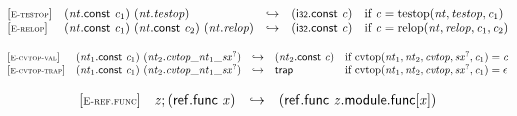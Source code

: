 \vspace{1ex}

$$
\begin{array}{@{}l@{}lcl@{}l@{}}
{[\textsc{\scriptsize E{-}testop}]} \quad & ({\mathit{nt}}.\mathsf{const}~{\mathit{c}}_{{1}})~({\mathit{nt}} . {\mathit{testop}}) &\hookrightarrow& (\mathsf{i{\scriptstyle32}}.\mathsf{const}~{\mathit{c}}) &\quad
  \mbox{if}~{\mathit{c}} = {\mathrm{testop}}({\mathit{nt}}, {\mathit{testop}}, {\mathit{c}}_{{1}}) \\
{[\textsc{\scriptsize E{-}relop}]} \quad & ({\mathit{nt}}.\mathsf{const}~{\mathit{c}}_{{1}})~({\mathit{nt}}.\mathsf{const}~{\mathit{c}}_{{2}})~({\mathit{nt}} . {\mathit{relop}}) &\hookrightarrow& (\mathsf{i{\scriptstyle32}}.\mathsf{const}~{\mathit{c}}) &\quad
  \mbox{if}~{\mathit{c}} = {\mathrm{relop}}({\mathit{nt}}, {\mathit{relop}}, {\mathit{c}}_{{1}}, {\mathit{c}}_{{2}}) \\
\end{array}
$$

\vspace{1ex}

$$
\begin{array}{@{}l@{}lcl@{}l@{}}
{[\textsc{\scriptsize E{-}cvtop{-}val}]} \quad & ({\mathit{nt}}_{{1}}.\mathsf{const}~{\mathit{c}}_{{1}})~({\mathit{nt}}_{{2}} . {{{{{\mathit{cvtop}}}{\mathsf{\_}}}{{\mathit{nt}}_{{1}}}}{\mathsf{\_}}}{{{\mathit{sx}}^?}}) &\hookrightarrow& ({\mathit{nt}}_{{2}}.\mathsf{const}~{\mathit{c}}) &\quad
  \mbox{if}~{\mathrm{cvtop}}({\mathit{nt}}_{{1}}, {\mathit{nt}}_{{2}}, {\mathit{cvtop}}, {{\mathit{sx}}^?}, {\mathit{c}}_{{1}}) = {\mathit{c}} \\
{[\textsc{\scriptsize E{-}cvtop{-}trap}]} \quad & ({\mathit{nt}}_{{1}}.\mathsf{const}~{\mathit{c}}_{{1}})~({\mathit{nt}}_{{2}} . {{{{{\mathit{cvtop}}}{\mathsf{\_}}}{{\mathit{nt}}_{{1}}}}{\mathsf{\_}}}{{{\mathit{sx}}^?}}) &\hookrightarrow& \mathsf{trap} &\quad
  \mbox{if}~{\mathrm{cvtop}}({\mathit{nt}}_{{1}}, {\mathit{nt}}_{{2}}, {\mathit{cvtop}}, {{\mathit{sx}}^?}, {\mathit{c}}_{{1}}) = \epsilon \\
\end{array}
$$

\vspace{1ex}

$$
\begin{array}{@{}l@{}lcl@{}l@{}}
{[\textsc{\scriptsize E{-}ref.func}]} \quad & {\mathit{z}} ; (\mathsf{ref.func}~{\mathit{x}}) &\hookrightarrow& (\mathsf{ref.func}~{\mathit{z}}.\mathsf{module}.\mathsf{func}{}[{\mathit{x}}]) &  \\
\end{array}
$$

